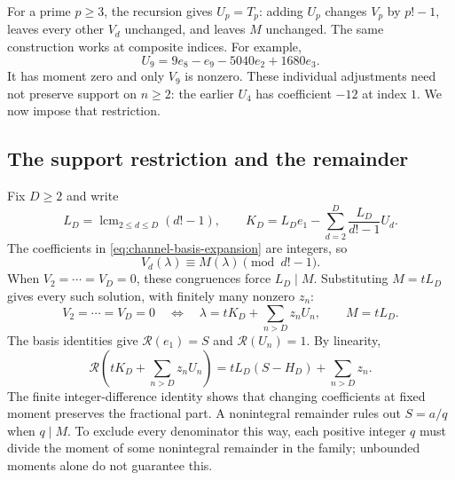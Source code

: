 \documentclass[11pt]{article}
\begin{document}
For a prime $p\ge3$, the recursion gives $U_p=T_p$: adding $U_p$ changes
$V_p$ by $p!-1$, leaves every other $V_d$ unchanged, and leaves $M$ unchanged.
The same construction works at composite indices. For example,
\begin{equation}
U_9=9e_8-e_9-5040e_2+1680e_3.
\label{res:translator}
\end{equation}
It has moment zero and only $V_9$ is nonzero. These individual adjustments
need not preserve support on $n\ge2$: the earlier $U_4$ has coefficient
$-12$ at index $1$. We now impose that restriction.
\subsection{The support restriction and the remainder}

Fix $D\ge2$ and write
\[
L_D=\operatorname{lcm}_{2\le d\le D}(d!-1),\qquad
K_D=L_De_1-\sum_{d=2}^D\frac{L_D}{d!-1}U_d.
\]
The coefficients in \eqref{eq:channel-basis-expansion} are integers, so
\begin{equation}
V_d(\lambda)\equiv M(\lambda)\pmod{d!-1}.
\label{res:congruence}
\end{equation}
When $V_2=\cdots=V_D=0$, these congruences force $L_D\mid M$.
Substituting $M=tL_D$ gives every such solution, with finitely many nonzero $z_n$:
\begin{equation}
V_2=\cdots=V_D=0
\quad\Longleftrightarrow\quad
\lambda=tK_D+\sum_{n>D}z_nU_n,\qquad M=tL_D.
\label{eq:low-channel-classification}
\end{equation}
The basis identities give $\mathcal R(e_1)=S$ and $\mathcal R(U_n)=1$.
By linearity,
\begin{equation}
\mathcal R\left(tK_D+\sum_{n>D}z_nU_n\right)
=tL_D(S-H_D)+\sum_{n>D}z_n.
\label{eq:residual-transparency}
\end{equation}
The finite integer-difference identity shows that changing coefficients
at fixed moment preserves the fractional part. A nonintegral remainder
rules out $S=a/q$ when $q\mid M$. To exclude every denominator this way,
each positive integer $q$ must divide the moment of some nonintegral
remainder in the family; unbounded moments alone do not guarantee this.
\end{document}
